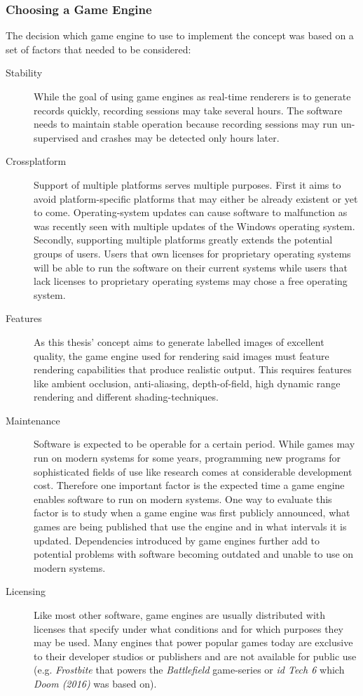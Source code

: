 \subsubsection{Choosing a Game Engine}
The decision which game engine to use to implement the concept was based on a set of factors that needed to be considered:
\begin{description}
\item [Stability] While the goal of using game engines as real-time renderers is to generate records quickly, recording sessions may take several hours. The software needs to maintain stable operation because recording sessions may run un-supervised and crashes may be detected only hours later.
\item [Crossplatform] Support of multiple platforms serves multiple purposes. First it aims to avoid platform-specific platforms that may either be already existent or yet to come. Operating-system updates can cause software to malfunction as was recently seen with multiple updates of the Windows operating system\cite{heiseWindowsUpdate}. Secondly, supporting multiple platforms greatly extends the potential groups of users. Users that own licenses for proprietary operating systems will be able to run the software on their current systems while users that lack licenses to proprietary operating systems may chose a free operating system. 
\item [Features] As this thesis' concept aims to generate labelled images of excellent quality, the game engine used for rendering said images must feature rendering capabilities that produce realistic output. This requires features like ambient occlusion, anti-aliasing, depth-of-field, high dynamic range rendering and different shading-techniques.
\item [Maintenance] Software is expected to be operable for a certain period. While games may run on modern systems for some years, programming new programs for sophisticated fields of use like research comes at considerable development cost. Therefore one important factor is the expected time a game engine enables software to run on modern systems. One way to evaluate this factor is to study when a game engine was first publicly announced, what games are being published that use the engine and in what intervals it is updated. Dependencies introduced by game engines further add to potential problems with software becoming outdated and unable to use on modern systems. 
\item [Licensing] Like most other software, game engines are usually distributed with licenses that specify under what conditions and for which purposes they may be used. Many engines that power popular games today are exclusive to their developer studios or publishers and are not available for public use (e.g. \textit{Frostbite} that powers the \textit{Battlefield} game-series or \textit{id Tech 6} which \textit{Doom (2016)} was based on). 

\end{description}
